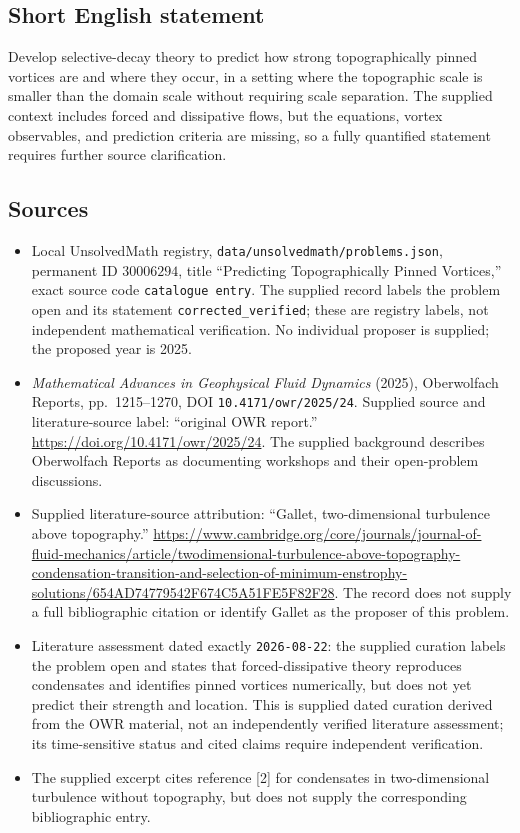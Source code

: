 \documentclass[11pt]{article}
\begin{document}
\subsection{Short English statement}
Develop selective-decay theory to predict how strong topographically pinned vortices are and where they occur, in a setting where the topographic scale is smaller than the domain scale without requiring scale separation. The supplied context includes forced and dissipative flows, but the equations, vortex observables, and prediction criteria are missing, so a fully quantified statement requires further source clarification.
\subsection{Sources}
\begin{itemize}
\item Local UnsolvedMath registry, \texttt{data/unsolvedmath/problems.json}, permanent ID \(30006294\), title ``Predicting Topographically Pinned Vortices,'' exact source code \texttt{catalogue entry}. The supplied record labels the problem open and its statement \texttt{corrected\_verified}; these are registry labels, not independent mathematical verification. No individual proposer is supplied; the proposed year is 2025.
\item \emph{Mathematical Advances in Geophysical Fluid Dynamics} (2025), Oberwolfach Reports, pp.\ 1215--1270, DOI \texttt{10.4171/owr/2025/24}. Supplied source and literature-source label: ``original OWR report.'' \url{https://doi.org/10.4171/owr/2025/24}. The supplied background describes Oberwolfach Reports as documenting workshops and their open-problem discussions.
\item Supplied literature-source attribution: ``Gallet, two-dimensional turbulence above topography.'' \url{https://www.cambridge.org/core/journals/journal-of-fluid-mechanics/article/twodimensional-turbulence-above-topography-condensation-transition-and-selection-of-minimum-enstrophy-solutions/654AD74779542F674C5A51FE5F82F28}. The record does not supply a full bibliographic citation or identify Gallet as the proposer of this problem.
\item Literature assessment dated exactly \texttt{2026-08-22}: the supplied curation labels the problem open and states that forced-dissipative theory reproduces condensates and identifies pinned vortices numerically, but does not yet predict their strength and location. This is supplied dated curation derived from the OWR material, not an independently verified literature assessment; its time-sensitive status and cited claims require independent verification.
\item The supplied excerpt cites reference [2] for condensates in two-dimensional turbulence without topography, but does not supply the corresponding bibliographic entry.
\end{itemize}
\end{document}
